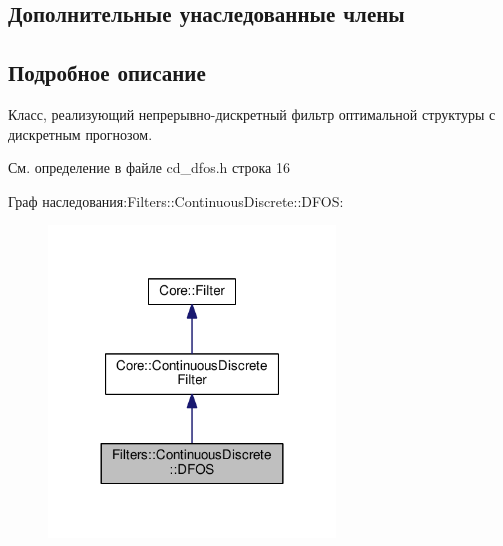 \subsection*{Дополнительные унаследованные члены}


\subsection{Подробное описание}
Класс, реализующий непрерывно-\/дискретный фильтр оптимальной структуры с дискретным прогнозом. 

См. определение в файле cd\+\_\+dfos.\+h строка 16



Граф наследования\+:Filters\+:\+:Continuous\+Discrete\+:\+:D\+F\+OS\+:
\nopagebreak
\begin{figure}[H]
\begin{center}
\leavevmode
\includegraphics[width=216pt]{class_filters_1_1_continuous_discrete_1_1_d_f_o_s__inherit__graph}
\end{center}
\end{figure}



